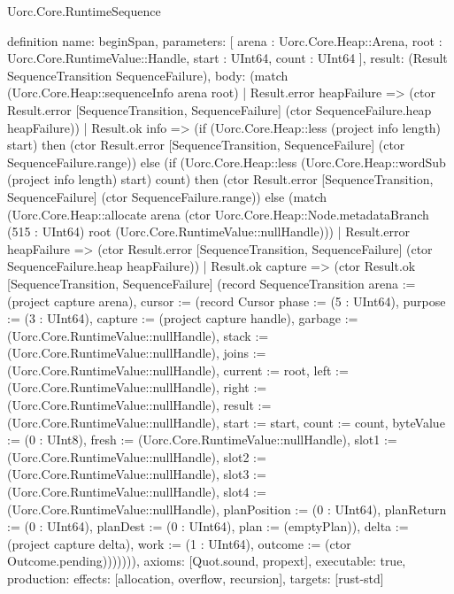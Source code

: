 \begin{lexlean}{Uorc.Core.RuntimeSequence}
\begin{semanticmodule}
definition{
  name: beginSpan,
  parameters: [
    arena : Uorc.Core.Heap::Arena,
    root : Uorc.Core.RuntimeValue::Handle,
    start : UInt64,
    count : UInt64
  ],
  result: (Result SequenceTransition SequenceFailure),
  body: (match (Uorc.Core.Heap::sequenceInfo arena root)
    | Result.error heapFailure => (ctor Result.error [SequenceTransition, SequenceFailure] (ctor SequenceFailure.heap heapFailure))
    | Result.ok info => (if (Uorc.Core.Heap::less (project info length) start) then (ctor Result.error [SequenceTransition, SequenceFailure] (ctor SequenceFailure.range)) else (if (Uorc.Core.Heap::less (Uorc.Core.Heap::wordSub (project info length) start) count) then (ctor Result.error [SequenceTransition, SequenceFailure] (ctor SequenceFailure.range)) else (match (Uorc.Core.Heap::allocate arena (ctor Uorc.Core.Heap::Node.metadataBranch (515 : UInt64) root (Uorc.Core.RuntimeValue::nullHandle)))
      | Result.error heapFailure => (ctor Result.error [SequenceTransition, SequenceFailure] (ctor SequenceFailure.heap heapFailure))
      | Result.ok capture => (ctor Result.ok [SequenceTransition, SequenceFailure] (record SequenceTransition {arena := (project capture arena), cursor := (record Cursor {phase := (5 : UInt64), purpose := (3 : UInt64), capture := (project capture handle), garbage := (Uorc.Core.RuntimeValue::nullHandle), stack := (Uorc.Core.RuntimeValue::nullHandle), joins := (Uorc.Core.RuntimeValue::nullHandle), current := root, left := (Uorc.Core.RuntimeValue::nullHandle), right := (Uorc.Core.RuntimeValue::nullHandle), result := (Uorc.Core.RuntimeValue::nullHandle), start := start, count := count, byteValue := (0 : UInt8), fresh := (Uorc.Core.RuntimeValue::nullHandle), slot1 := (Uorc.Core.RuntimeValue::nullHandle), slot2 := (Uorc.Core.RuntimeValue::nullHandle), slot3 := (Uorc.Core.RuntimeValue::nullHandle), slot4 := (Uorc.Core.RuntimeValue::nullHandle), planPosition := (0 : UInt64), planReturn := (0 : UInt64), planDest := (0 : UInt64), plan := (emptyPlan)}), delta := (project capture delta), work := (1 : UInt64), outcome := (ctor Outcome.pending)})))))),
  axioms: [Quot.sound, propext],
  executable: true,
  production: {effects: [allocation, overflow, recursion], targets: [rust-std]}
}


\end{semanticmodule}
\end{lexlean}
